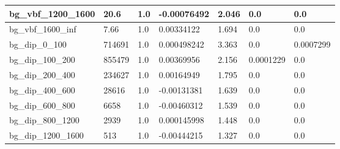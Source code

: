 \documentclass[a4paper, 10pt]{article}
\begin{document}
\begin{table}[H]
\begin{center}
\begin{tabular}{|m{23.0mm}|m{23.0mm}|m{18.0mm}|m{19.0mm}|m{19.0mm}|m{19.0mm}|m{19.0mm}|}
      \hline
      {\cellcolor{white}         bg\_vbf\_1200\_1600}& {\cellcolor{white}         20.6}& {\cellcolor{white}         1.0}& {\cellcolor{white}         -0.00076492}& {\cellcolor{white}         2.046}& {\cellcolor{green}         0.0}& {\cellcolor{green}         0.0}\\
      \hline
      {\cellcolor{white}         bg\_vbf\_1600\_inf}& {\cellcolor{white}         7.66}& {\cellcolor{white}         1.0}& {\cellcolor{white}         0.00334122}& {\cellcolor{white}         1.694}& {\cellcolor{green}         0.0}& {\cellcolor{green}         0.0}\\
      \hline
      {\cellcolor{white}         bg\_dip\_0\_100}& {\cellcolor{white}         714691}& {\cellcolor{white}         1.0}& {\cellcolor{white}         0.000498242}& {\cellcolor{white}         3.363}& {\cellcolor{green}         0.0}& {\cellcolor{green}         0.0007299}\\
      \hline
      {\cellcolor{white}         bg\_dip\_100\_200}& {\cellcolor{white}         855479}& {\cellcolor{white}         1.0}& {\cellcolor{white}         0.00369956}& {\cellcolor{white}         2.156}& {\cellcolor{green}         0.0001229}& {\cellcolor{green}         0.0}\\
      \hline
      {\cellcolor{white}         bg\_dip\_200\_400}& {\cellcolor{white}         234627}& {\cellcolor{white}         1.0}& {\cellcolor{white}         0.00164949}& {\cellcolor{white}         1.795}& {\cellcolor{green}         0.0}& {\cellcolor{green}         0.0}\\
      \hline
      {\cellcolor{white}         bg\_dip\_400\_600}& {\cellcolor{white}         28616}& {\cellcolor{white}         1.0}& {\cellcolor{white}         -0.00131381}& {\cellcolor{white}         1.639}& {\cellcolor{green}         0.0}& {\cellcolor{green}         0.0}\\
      \hline
      {\cellcolor{white}         bg\_dip\_600\_800}& {\cellcolor{white}         6658}& {\cellcolor{white}         1.0}& {\cellcolor{white}         -0.00460312}& {\cellcolor{white}         1.539}& {\cellcolor{green}         0.0}& {\cellcolor{green}         0.0}\\
      \hline
      {\cellcolor{white}         bg\_dip\_800\_1200}& {\cellcolor{white}         2939}& {\cellcolor{white}         1.0}& {\cellcolor{white}         0.000145998}& {\cellcolor{white}         1.448}& {\cellcolor{green}         0.0}& {\cellcolor{green}         0.0}\\
      \hline
      {\cellcolor{white}         bg\_dip\_1200\_1600}& {\cellcolor{white}         513}& {\cellcolor{white}         1.0}& {\cellcolor{white}         -0.00444215}& {\cellcolor{white}         1.327}& {\cellcolor{green}         0.0}& {\cellcolor{green}         0.0}\\

\end{tabular}
\end{center}
\end{table}
\end{document}
